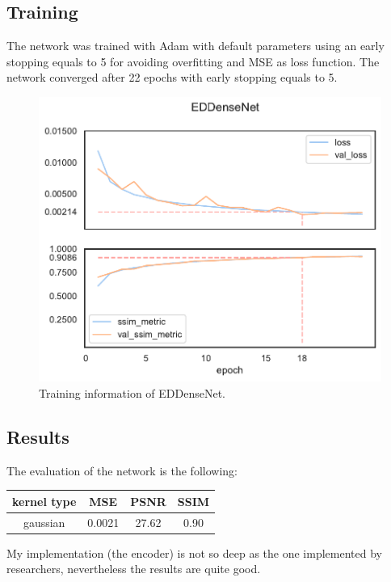 \subsection{Training}
The network was trained with Adam\cite{adam} with default parameters using an early stopping equals to 5 for avoiding overfitting and MSE as loss function.
The network converged after 22 epochs with early stopping equals to 5.
\begin{figure}[H]
    \centering
    \includegraphics[height=0.4\textheight,keepaspectratio]{subsections/densenet/plot_history_EDDenseNet.pdf}
    \caption{Training information of EDDenseNet.}
\end{figure}        

\subsection{Results}
The evaluation of the network is the following:
\begin{center}
    \small
    \begin{tabularx}{165pt}{c|ccc}
        \centering
        kernel type & MSE & PSNR & SSIM \\
        \hline
        gaussian & 0.0021 & 27.62 & 0.90
    \end{tabularx}        
\end{center}

My implementation (the encoder) is not so deep as the one implemented by researchers, nevertheless the results are quite good.

